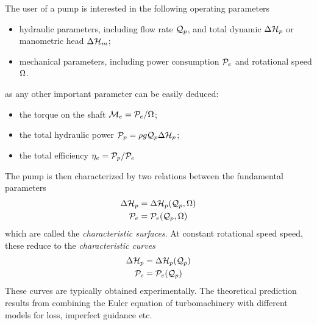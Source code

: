 The user of a pump is interested in the following operating parameters
\begin{itemize}
\item hydraulic parameters, including flow rate $\mathcal Q_p$, and total
  dynamic $\Delta \mathcal H_p$ or manometric head $\Delta \mathcal H_m$;
\item mechanical parameters, including power consumption $\mathcal P_e$
  and rotational speed $\Omega$.
\end{itemize}
as any other important parameter can be easily deduced:
\begin{itemize}
\item the torque on the shaft $\mathcal M_e = \mathcal P_e / \Omega$;
\item the total hydraulic power $\mathcal P_p = \rho g \mathcal Q_p \Delta \mathcal H_p$;
\item the total efficiency $\eta_e=\mathcal P_p/\mathcal P_e$
\end{itemize}
The pump is then characterized by two relations between the
fundamental parameters
\begin{align*}
  \Delta \mathcal H_p &= \Delta \mathcal H_p(\mathcal Q_p,\Omega)  \\
  \mathcal P_e &= \mathcal P_e(\mathcal Q_p,\Omega) 
\end{align*}
which are called the \emph{characteristic surfaces}. At constant
rotational speed speed, these reduce to the \emph{characteristic
  curves}
\begin{align*}
  \Delta \mathcal H_p &= \Delta \mathcal H_p(\mathcal Q_p)  \\
  \mathcal P_e &= \mathcal P_e(\mathcal Q_p) 
\end{align*}
These curves are typically obtained experimentally. The theoretical
prediction results from combining the Euler equation of turbomachinery
with different models for loss, imperfect guidance etc.




